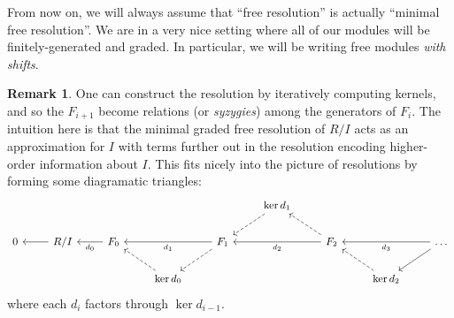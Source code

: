 \documentclass[12pt,a4paper]{article}
\theoremstyle{definition}
\newtheorem{remark}[theorem]{Remark}
\numberwithin{equation}{section}
\begin{document}
From now on, we will always assume that ``free resolution'' is actually ``minimal free resolution''.
We are in a very nice setting where all of our modules will be finitely-generated and graded.
In particular, we will be writing free modules \emph{with shifts}.

\begin{remark}
    \label{remark: free resolution algorithm}
    One can construct the resolution by iteratively computing kernels, and so the $F_{i+1}$ become relations (or \emph{syzygies}) among the generators of $F_i$.
    The intuition here is that the minimal graded free resolution of $R/I$ acts as an approximation for $I$ with terms further out in the resolution encoding higher-order information about $I$.
    This fits nicely into the picture of resolutions by forming some diagramatic triangles:
    \begin{equation*}
    \small
    \begin{tikzcd}
        {} & {} & {} & {} & {} & \ker{d_1} \arrow[dl,dashed] & {} & {} & {} \\
        0 & R/I \arrow[l] & F_0 \arrow[l,"d_0"] & {} & F_1 \arrow[ll,"d_1"] \arrow[dl,dashed] & {} & F_2 \arrow[ll,"d_2"] \arrow[ul,dashed] & {} & \dots \arrow[ll,"d_3"] \arrow[dl] \\
        {} & {} & {} & \ker{d_0} \arrow[ul,dashed] & {} & {} & {} & \ker{d_2} \arrow[ul,dashed] & {}
    \end{tikzcd}
    \end{equation*}
    where each $d_i$ factors through $\ker{d_{i-1}}$.
\end{remark}
\end{document}

